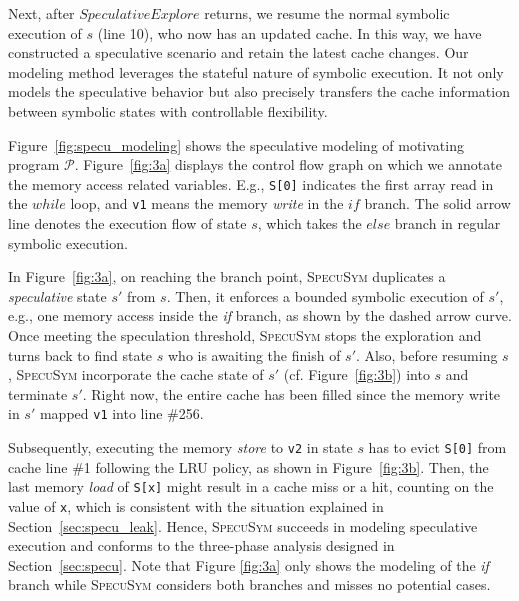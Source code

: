\documentclass[sigconf]{acmart}
\newcommand{\SpecuSym}{\textsc{SpecuSym} }
\newcommand{\prog}{\mathcal{P}}
\begin{document}
Next, after $\mathit{SpeculativeExplore}$ returns, we resume the normal symbolic
execution of $s$ (line 10), who now has an updated cache. In this way, we   have 
constructed a speculative scenario and retain the latest cache changes. Our
modeling method leverages the stateful nature of symbolic execution. It not only 
models the speculative behavior but also precisely transfers the cache information 
between symbolic states with controllable flexibility. 


Figure~\ref{fig:specu_modeling} shows the speculative modeling of motivating 
program $\prog$. Figure~\ref{fig:3a} displays the control flow graph on 
which we annotate the memory access related variables. E.g., \texttt{S[0]} 
indicates the first array read in the $\mathit{while}$ loop, and \texttt{v1} 
means the memory \emph{write} in the $\mathit{if}$ branch. The solid arrow 
line denotes the execution flow of state $s$, which takes the $\mathit{else}$ 
branch in regular symbolic execution. 


In Figure~\ref{fig:3a}, on reaching the branch point, \SpecuSym duplicates a 
\textit{speculative} state $s'$ from $s$. Then, it enforces a bounded symbolic 
execution of $s'$, e.g., one memory access inside the \textit{if} branch, as 
shown by the dashed arrow curve. Once meeting the speculation threshold, 
\SpecuSym stops the exploration and turns back to find state $s$ who is awaiting 
the finish of $s'$. Also, before resuming $s$, \SpecuSym incorporate the cache 
state of $s'$ (cf. Figure~\ref{fig:3b}) into $s$ and terminate $s'$. Right now, 
the entire cache has been filled since the memory write in $s'$ mapped \texttt{v1} 
into line \#256. 


Subsequently, executing the memory \emph{store} to \texttt{v2} in state $s$ has
to evict \texttt{S[0]} from cache line \#1 following the LRU policy, as shown in 
Figure~\ref{fig:3b}. Then, the last memory \emph{load} of \texttt{S[x]} might 
result in a cache miss or a hit, counting on the value of \texttt{x}, which is 
consistent with the situation explained in Section~\ref{sec:specu_leak}. Hence, 
\SpecuSym succeeds in modeling speculative execution and conforms to the 
three-phase analysis designed in Section~\ref{sec:specu}. Note that Figure
\ref{fig:3a} only shows the modeling of the \emph{if} branch while \SpecuSym 
considers both branches and misses no potential cases. 

\end{document}
